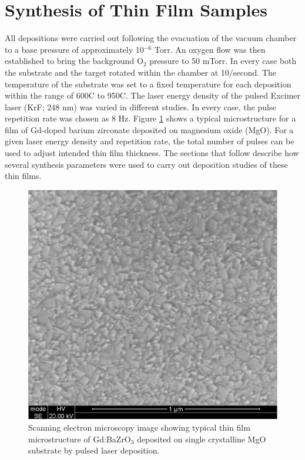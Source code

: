 \vspace{12pt}
\section{Synthesis of Thin Film Samples}
All depositions were carried out following the evacuation of the vacuum chamber to a base pressure of approximately 10$^{-6}$ Torr. An oxygen flow was then established to bring the background O$_2$ pressure to 50 mTorr. In every case both the substrate and the target rotated within the chamber at 10\textdegree/second. The temperature of the substrate was set to a fixed temperature for each deposition within the range of 600\textdegree C to 950\textdegree C. The laser energy density of the pulsed Excimer laser (KrF; 248 nm) was varied in different studies. In every case, the pulse repetition rate was chosen as 8 Hz. Figure \ref{fig:films:sem:surface} shows a typical microstructure for a film of Gd-doped barium zirconate deposited on magnesium oxide (MgO). For a given laser energy density and repetition rate, the total number of pulses can be used to adjust intended thin film thickness. The sections that follow describe how several synthesis parameters were used to carry out deposition studies of these thin films.

\begin{figure}
    \centering
    \includegraphics[width=.7\textwidth]{Figures/BZG-MgO-850-100000x-SE_019.pdf}
    \caption{Scanning electron microscopy image showing typical thin film microstructure of Gd:BaZrO$_3$ deposited on single crystalline MgO substrate by pulsed laser deposition.}
    \label{fig:films:sem:surface}
\end{figure}